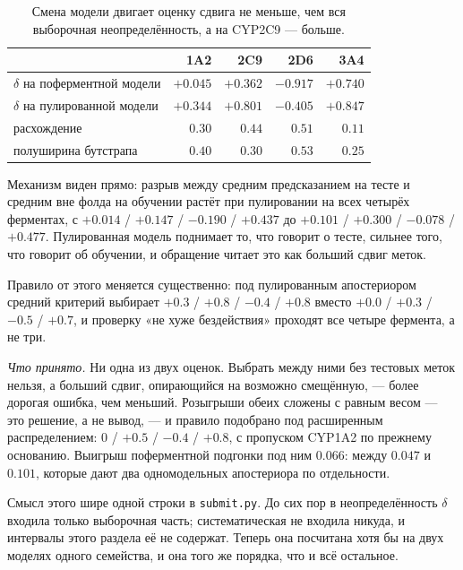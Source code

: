 \begin{table}[htbp]\centering\small
\begin{tabularx}{\textwidth}{@{}Xrrrr@{}}
\toprule
& 1A2 & 2C9 & 2D6 & 3A4 \\
\midrule
$\delta$ на поферментной модели & $+0.045$ & $+0.362$ & $-0.917$ & $+0.740$ \\
$\delta$ на пулированной модели & $+0.344$ & $+0.801$ & $-0.405$ & $+0.847$ \\
\addlinespace[2pt]
расхождение & $0.30$ & $\mathbf{0.44}$ & $0.51$ & $0.11$ \\
полуширина бутстрапа & $0.40$ & $\mathbf{0.30}$ & $0.53$ & $0.25$ \\
\bottomrule
\end{tabularx}
\caption{Смена модели двигает оценку сдвига не меньше, чем вся выборочная неопределённость,
а на CYP2C9 --- больше.}
\label{tab:deltamodel}
\end{table}

Механизм виден прямо: разрыв между средним предсказанием на тесте и средним вне фолда на
обучении растёт при пулировании на всех четырёх ферментах, с $+0.014$ / $+0.147$ / $-0.190$ /
$+0.437$ до $+0.101$ / $+0.300$ / $-0.078$ / $+0.477$. Пулированная модель поднимает то, что
говорит о тесте, сильнее того, что говорит об обучении, и обращение читает это как больший
сдвиг меток.

Правило от этого меняется существенно: под пулированным апостериором средний критерий выбирает
$+0.3$ / $+0.8$ / $-0.4$ / $+0.8$ вместо $+0.0$ / $+0.3$ / $-0.5$ / $+0.7$, и проверку «не хуже
бездействия» проходят все четыре фермента, а не три.

\emph{Что принято.} Ни одна из двух оценок. Выбрать между ними без тестовых меток нельзя, а
больший сдвиг, опирающийся на возможно смещённую, --- более дорогая ошибка, чем меньший.
Розыгрыши обеих сложены с равным весом --- это решение, а не вывод, --- и правило подобрано под
расширенным распределением: $0$ / $+0.5$ / $-0.4$ / $+0.8$, с пропуском CYP1A2 по прежнему
основанию. Выигрыш поферментной подгонки под ним $0.066$: между $0.047$ и $0.101$, которые дают
два одномодельных апостериора по отдельности.

Смысл этого шире одной строки в \texttt{submit.py}. До сих пор в неопределённость $\delta$
входила только выборочная часть; систематическая не входила никуда, и интервалы этого раздела
её не содержат. Теперь она посчитана хотя бы на двух моделях одного семейства, и она того же
порядка, что и всё остальное.

